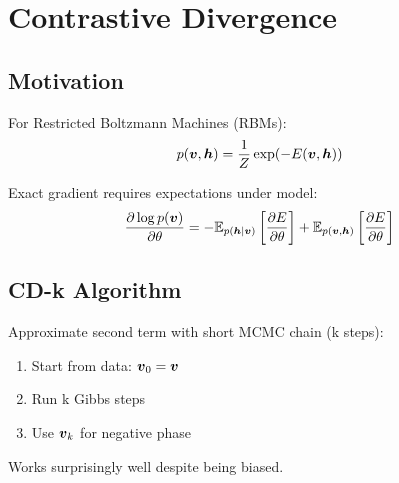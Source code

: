 
\section{Contrastive Divergence }
\label{sec:contrastive-divergence}

\subsection{Motivation}

For Restricted Boltzmann Machines (RBMs):
\begin{equation}
p(\boldsymbol{v}, \boldsymbol{h}) = \frac{1}{Z} \exp(-E(\boldsymbol{v}, \boldsymbol{h}))
\end{equation}

Exact gradient requires expectations under model:
\begin{equation}
\frac{\partial \log p(\boldsymbol{v})}{\partial \theta} = -\mathbb{E}_{p(\boldsymbol{h}|\boldsymbol{v})}\left[\frac{\partial E}{\partial \theta}\right] + \mathbb{E}_{p(\boldsymbol{v}, \boldsymbol{h})}\left[\frac{\partial E}{\partial \theta}\right]
\end{equation}

\subsection{CD-k Algorithm}

Approximate second term with short MCMC chain (k steps):
\begin{enumerate}
    \item Start from data: $\boldsymbol{v}_0 = \boldsymbol{v}$
    \item Run k Gibbs steps
    \item Use $\boldsymbol{v}_k$ for negative phase
\end{enumerate}

Works surprisingly well despite being biased.





